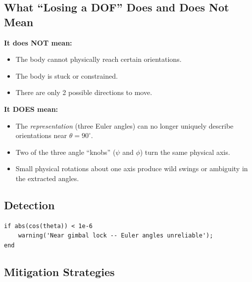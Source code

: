 \documentclass[12pt,a4paper]{article}
\begin{document}
\subsection{What ``Losing a DOF'' Does and Does Not Mean}

\textbf{It does NOT mean:}
\begin{itemize}[label=$\times$]
  \item The body cannot physically reach certain orientations.
  \item The body is stuck or constrained.
  \item There are only 2 possible directions to move.
\end{itemize}

\textbf{It DOES mean:}
\begin{itemize}[label=\checkmark]
  \item The \emph{representation} (three Euler angles) can no longer uniquely
        describe orientations near $\theta = 90^\circ$.
  \item Two of the three angle ``knobs'' ($\psi$ and $\phi$) turn the same
        physical axis.
  \item Small physical rotations about one axis produce wild swings or
        ambiguity in the extracted angles.
\end{itemize}

\subsection{Detection}

\begin{lstlisting}[style=matlab, caption={Detecting gimbal lock in MATLAB.}]
% After extracting pitch (theta) from a rotation matrix:
if abs(cos(theta)) < 1e-6
    warning('Near gimbal lock -- Euler angles unreliable');
end
\end{lstlisting}

\subsection{Mitigation Strategies}
\end{document}
